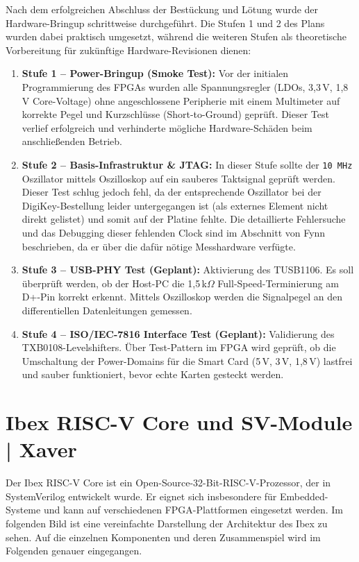 \documentclass[a4paper,11pt]{article}
\begin{document}
Nach dem erfolgreichen Abschluss der Bestückung und Lötung wurde der Hardware-Bringup schrittweise durchgeführt. Die Stufen 1 und 2 des Plans wurden dabei praktisch umgesetzt, während die weiteren Stufen als theoretische Vorbereitung für zukünftige Hardware-Revisionen dienen:
\begin{enumerate}
	\item \textbf{Stufe 1 – Power-Bringup (Smoke Test):} Vor der initialen Programmierung des FPGAs wurden alle Spannungsregler (LDOs, 3,3\,V, 1,8\,V Core-Voltage) ohne angeschlossene Peripherie mit einem Multimeter auf korrekte Pegel und Kurzschlüsse (Short-to-Ground) geprüft. Dieser Test verlief erfolgreich und verhinderte mögliche Hardware-Schäden beim anschließenden Betrieb.
	\item \textbf{Stufe 2 – Basis-Infrastruktur \& JTAG:} In dieser Stufe sollte der \texttt{10\,MHz} Oszillator mittels Oszilloskop auf ein sauberes Taktsignal geprüft werden. Dieser Test schlug jedoch fehl, da der entsprechende Oszillator bei der DigiKey-Bestellung leider untergegangen ist (als externes Element nicht direkt gelistet) und somit auf der Platine fehlte. Die detaillierte Fehlersuche und das Debugging dieser fehlenden Clock sind im Abschnitt von Fynn beschrieben, da er über die dafür nötige Messhardware verfügte.
	\item \textbf{Stufe 3 – USB-PHY Test (Geplant):} Aktivierung des TUSB1106. Es soll überprüft werden, ob der Host-PC die 1,5\,k$\Omega$ Full-Speed-Terminierung am D+-Pin korrekt erkennt. Mittels Oszilloskop werden die Signalpegel an den differentiellen Datenleitungen gemessen.
	\item \textbf{Stufe 4 – ISO/IEC-7816 Interface Test (Geplant):} Validierung des TXB0108-Levelshifters. Über Test-Pattern im FPGA wird geprüft, ob die Umschaltung der Power-Domains für die Smart Card (5\,V, 3\,V, 1,8\,V) lastfrei und sauber funktioniert, bevor echte Karten gesteckt werden.
\end{enumerate}
\newpage
\section{Ibex RISC-V Core und SV-Module | Xaver}

Der Ibex RISC-V Core ist ein Open-Source-32-Bit-RISC-V-Prozessor, der in SystemVerilog entwickelt wurde. Er eignet sich insbesondere für Embedded-Systeme und kann auf verschiedenen FPGA-Plattformen eingesetzt werden. Im folgenden Bild ist eine vereinfachte Darstellung der Architektur des Ibex zu sehen. Auf die einzelnen Komponenten und deren Zusammenspiel wird im Folgenden genauer eingegangen.
\end{document}
